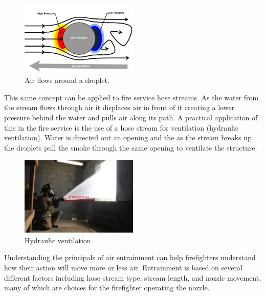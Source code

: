 \documentclass[12pt,oneside]{book}
\begin{document}
\begin{figure}[H]
\centering
\includegraphics[width=0.5\textwidth]{Figures/Air_Entrainment/Droplet_Etrainment.png}
\caption[Air Flow Around a Droplet]{Air flows around a droplet.}
\label{fig:droplet_flow}
\end{figure}

This same concept can be applied to fire service hose streams. As the water from the stream flows through air it displaces air in front of it creating a lower pressure behind the water and pulls air along its path. A practical application of this in the fire service is the use of a hose stream for ventilation (hydraulic ventilation). Water is directed out an opening and the as the stream breaks up the droplets pull the smoke through the same opening to ventilate the structure.

\begin{figure}[H]
\centering
\includegraphics[width=0.5\textwidth]{Figures/Air_Entrainment/Hydraulic_Ventilation.png}
\caption[Hydraulic ventilation]{Hydraulic ventilation.}
\label{fig:Hydraulic_Vent}
\end{figure}
 
Understanding the principals of air entrainment can help firefighters understand how their action will move more or less air. Entrainment is based on several different factors including hose stream type, stream length, and nozzle movement, many of which are choices for the firefighter operating the nozzle.
\end{document}

